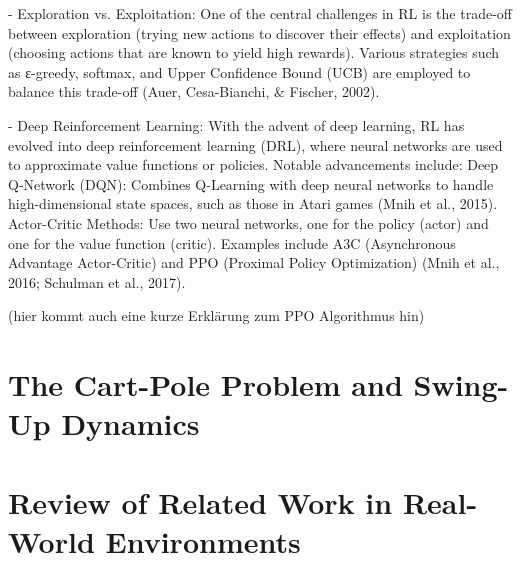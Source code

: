 - Exploration vs. Exploitation: One of the central challenges in RL is the trade-off between exploration (trying new actions to discover their effects) and exploitation (choosing actions that are known to yield high rewards). Various strategies such as ε-greedy, softmax, and Upper Confidence Bound (UCB) are employed to balance this trade-off (Auer, Cesa-Bianchi, & Fischer, 2002).

- Deep Reinforcement Learning: With the advent of deep learning, RL has evolved into deep reinforcement learning (DRL), where neural networks are used to approximate value functions or policies. Notable advancements include: Deep Q-Network (DQN): Combines Q-Learning with deep neural networks to handle high-dimensional state spaces, such as those in Atari games (Mnih et al., 2015). Actor-Critic Methods: Use two neural networks, one for the policy (actor) and one for the value function (critic). Examples include A3C (Asynchronous Advantage Actor-Critic) and PPO (Proximal Policy Optimization) (Mnih et al., 2016; Schulman et al., 2017).

(hier kommt auch eine kurze Erklärung zum PPO Algorithmus hin)

\section{The Cart-Pole Problem and Swing-Up Dynamics}

\section{Review of Related Work in Real-World Environments}